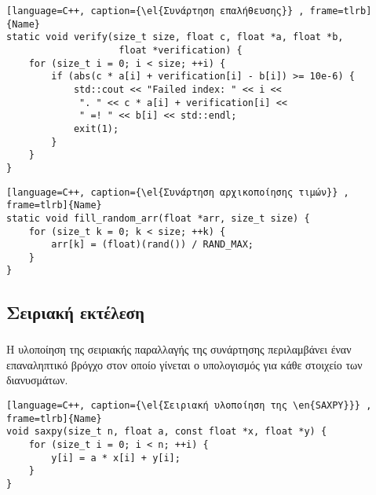 \begin{spacing}{1}
\begin{lstlisting}[language=C++, caption={\el{Συνάρτηση επαλήθευσης}} , frame=tlrb]{Name}
static void verify(size_t size, float c, float *a, float *b, 
                    float *verification) {
    for (size_t i = 0; i < size; ++i) {
        if (abs(c * a[i] + verification[i] - b[i]) >= 10e-6) {
            std::cout << "Failed index: " << i <<
             ". " << c * a[i] + verification[i] << 
             " =! " << b[i] << std::endl;
            exit(1);
        }
    }
}
\end{lstlisting}
\end{spacing}

\begin{spacing}{1}
\begin{lstlisting}[language=C++, caption={\el{Συνάρτηση αρχικοποίησης τιμών}} , frame=tlrb]{Name}
static void fill_random_arr(float *arr, size_t size) {
    for (size_t k = 0; k < size; ++k) {
        arr[k] = (float)(rand()) / RAND_MAX;
    }
}       
\end{lstlisting}
\end{spacing}

\clearpage
\subsection{Σειριακή εκτέλεση}
\subparagraph{}
Η υλοποίηση της σειριακής παραλλαγής της συνάρτησης  περιλαμβάνει έναν επαναληπτικό 
βρόγχο στον οποίο γίνεται ο υπολογισμός για κάθε στοιχείο των διανυσμάτων.
\begin{spacing}{0.8}
\begin{lstlisting}[language=C++, caption={\el{Σειριακή υλοποίηση της \en{SAXPY}}} , frame=tlrb]{Name}
void saxpy(size_t n, float a, const float *x, float *y) {
    for (size_t i = 0; i < n; ++i) {
        y[i] = a * x[i] + y[i];
    }
}   
\end{lstlisting}
\end{spacing}


